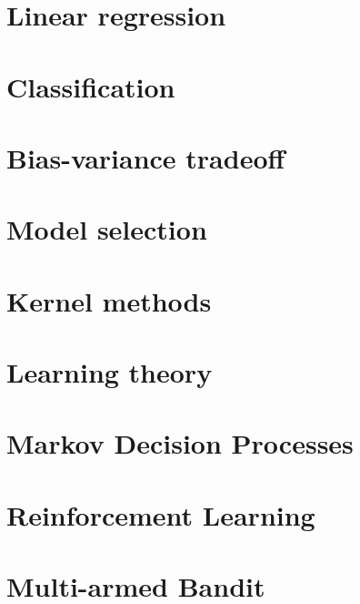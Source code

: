 \documentclass[12pt, a4paper]{report}
\begin{document}
    \appendix
    \chapter{Linear regression}
    
    
    

    \chapter{Classification}
    
    
    
    
    
    
    

    \chapter{Bias-variance tradeoff}
    
    
    

    \chapter{Model selection}
    
    
    

    \chapter{Kernel methods}
    
    
    

    \chapter{Learning theory}
    
    
    

    \chapter{Markov Decision Processes}
    



    \chapter{Reinforcement Learning}


    \chapter{Multi-armed Bandit}



    
\end{document}

